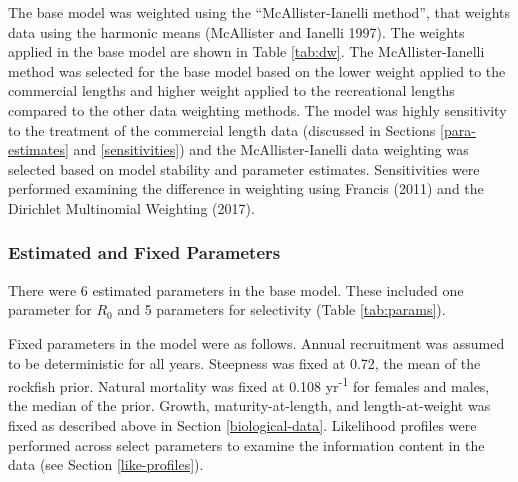 \documentclass[11pt,
  english,
  a4paper,
]{article}
\begin{document}
\leavevmode\tagmcend\tagstructend\par


The base model was weighted using the ``McAllister-Ianelli method'', that weights data using the harmonic means {(McAllister and Ianelli 1997)\leavevmode\tagmcend\tagstructend}. The weights applied in the base model are shown in Table \ref{tab:dw}. The McAllister-Ianelli method was selected for the base model based on the lower weight applied to the commercial lengths and higher weight applied to the recreational lengths compared to the other data weighting methods. The model was highly sensitivity to the treatment of the commercial length data (discussed in Sections \ref{para-estimates} and \ref{sensitivities}) and the McAllister-Ianelli data weighting was selected based on model stability and parameter estimates. Sensitivities were performed examining the difference in weighting using Francis {(2011)\leavevmode\tagmcend\tagstructend} and the Dirichlet Multinomial Weighting {(2017)\leavevmode\tagmcend\tagstructend}.

\leavevmode\tagmcend\tagstructend\par


\hypertarget{estimated-and-fixed-parameters}{%
\subsubsection{Estimated and Fixed Parameters}\label{estimated-and-fixed-parameters}}

\leavevmode\tagmcend\tagstructend


There were 6 estimated parameters in the base model. These included one parameter for {\(R_0\)\leavevmode\tagmcend\tagstructend} and 5 parameters for selectivity (Table \ref{tab:params}).

\leavevmode\tagmcend\tagstructend\par


Fixed parameters in the model were as follows. Annual recruitment was assumed to be deterministic for all years. Steepness was fixed at 0.72, the mean of the rockfish prior. Natural mortality was fixed at 0.108 yr\textsuperscript{-1} for females and males, the median of the prior. Growth, maturity-at-length, and length-at-weight was fixed as described above in Section \ref{biological-data}. Likelihood profiles were performed across select parameters to examine the information content in the data (see Section \ref{like-profiles}).
\end{document}
